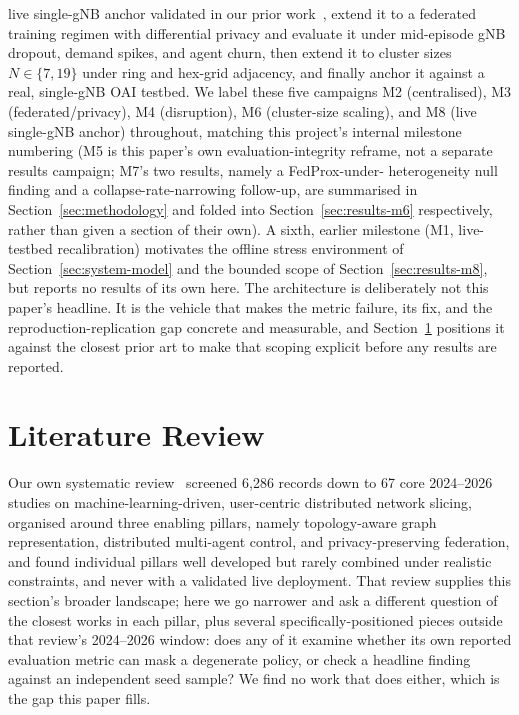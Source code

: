 \documentclass[journal]{IEEEtran}
\begin{document}
live single-gNB anchor validated in our prior
work~\cite{mecon-paper1,icraie-paper2}, extend it to a federated
training regimen with differential privacy and evaluate it under
mid-episode gNB dropout, demand spikes, and agent churn, then extend it to
cluster sizes $N \in \{7, 19\}$ under ring and hex-grid adjacency, and
finally anchor it against a real, single-gNB OAI testbed. We
label these five campaigns M2 (centralised), M3 (federated/privacy), M4
(disruption), M6 (cluster-size scaling), and M8 (live single-gNB
anchor) throughout, matching this project's internal milestone
numbering (M5 is this paper's own evaluation-integrity reframe, not a
separate results campaign; M7's two results, namely a FedProx-under-
heterogeneity null finding and a collapse-rate-narrowing follow-up,
are summarised in Section~\ref{sec:methodology} and folded into
Section~\ref{sec:results-m6} respectively, rather than given a section
of their own).
A sixth, earlier milestone (M1, live-testbed recalibration) motivates
the offline stress environment of Section~\ref{sec:system-model} and
the bounded scope of Section~\ref{sec:results-m8}, but reports no
results of its own here.
The architecture is deliberately not this paper's headline. It is the
vehicle that makes the metric failure, its fix, and the
reproduction-replication gap concrete and measurable, and
Section~\ref{sec:litreview} positions it against the closest prior art
to make that scoping explicit before any results are reported.

\section{Literature Review}
\label{sec:litreview}
Our own systematic review~\cite{ref:access} screened 6{,}286 records
down to 67 core 2024--2026 studies on machine-learning-driven,
user-centric distributed network slicing, organised around three
enabling pillars, namely topology-aware graph representation, distributed
multi-agent control, and privacy-preserving federation, and found
individual pillars well developed but rarely combined under realistic
constraints, and never with a validated live deployment. That review
supplies this section's broader landscape; here we go narrower and
ask a different question of the closest works in each pillar, plus
several specifically-positioned pieces outside that review's
2024--2026 window: does any of it examine whether its own reported
evaluation metric can mask a degenerate policy, or check a headline
finding against an independent seed sample? We find no work that does
either, which is the gap this paper fills.
\end{document}
